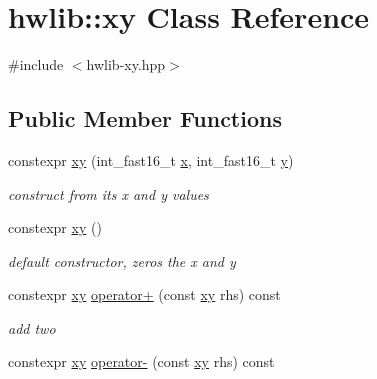 \hypertarget{classhwlib_1_1xy}{}\section{hwlib\+:\+:xy Class Reference}
\label{classhwlib_1_1xy}


{\ttfamily \#include $<$hwlib-\/xy.\+hpp$>$}

\subsection*{Public Member Functions}
\begin{DoxyCompactItemize}
\item 
\mbox{\label{classhwlib_1_1xy_a65546ae5442aa989a6d8ba1a7994233d}} 
constexpr \hyperlink{classhwlib_1_1xy_a65546ae5442aa989a6d8ba1a7994233d}{xy} (int\+\_\+fast16\+\_\+t \hyperlink{classhwlib_1_1xy_a7f7c8b3888ce9d2ba014b8d36a86abb1}{x}, int\+\_\+fast16\+\_\+t \hyperlink{classhwlib_1_1xy_a6a665ea6d31ce71d9f3a533986744086}{y})
\begin{DoxyCompactList}\small\item\em construct from its x and y values \end{DoxyCompactList}\item 
\mbox{\label{classhwlib_1_1xy_a922b5ffe394b7c08ed62c7dcd544e108}} 
constexpr \hyperlink{classhwlib_1_1xy_a922b5ffe394b7c08ed62c7dcd544e108}{xy} ()
\begin{DoxyCompactList}\small\item\em default constructor, zero\textquotesingle{}s the x and y \end{DoxyCompactList}\item 
\mbox{\label{classhwlib_1_1xy_ad653d6eed097bcab167f5da86c48da5e}} 
constexpr \hyperlink{classhwlib_1_1xy}{xy} \hyperlink{classhwlib_1_1xy_ad653d6eed097bcab167f5da86c48da5e}{operator+} (const \hyperlink{classhwlib_1_1xy}{xy} rhs) const
\begin{DoxyCompactList}\small\item\em add two \end{DoxyCompactList}\item 
\mbox{\label{classhwlib_1_1xy_a7d221ca71767e3c35a00dee2d5f65853}} 
constexpr \hyperlink{classhwlib_1_1xy}{xy} \hyperlink{classhwlib_1_1xy_a7d221ca71767e3c35a00dee2d5f65853}{operator-\/} (const \hyperlink{classhwlib_1_1xy}{xy} rhs) const

\end{DoxyCompactItemize}
